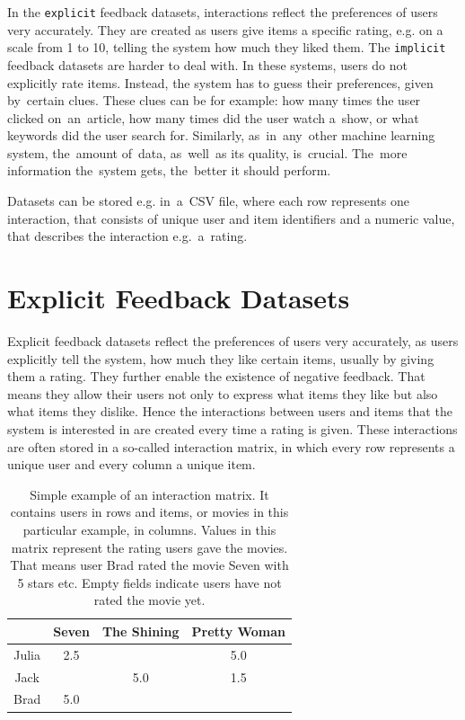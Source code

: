 In the \texttt{explicit} feedback datasets, interactions reflect the preferences of users very accurately. They are created as users give items a specific rating, e.g. on a scale from 1 to 10, telling the system how much they liked them. The \texttt{implicit} feedback datasets are harder to deal with. In these systems, users do not explicitly rate items. Instead, the system has to guess their preferences, given by~certain clues. These clues can be for example: how many times the user clicked on~an~article, how many times did the user watch a~show, or what keywords did the user search for.
Similarly, as~in~any~other machine learning system, the~amount of~data, as~well~as its quality, is~crucial. The~more information the~system gets, the~better it should perform.

Datasets can be stored e.g. in~a~CSV file, where each row represents one interaction, that consists of unique user and item identifiers and a numeric value, that describes the interaction e.g.~a~rating.


\section{Explicit Feedback Datasets}

Explicit feedback datasets reflect the preferences of users very accurately, as users explicitly tell the system, how much they like certain items, usually by giving them a rating. They further enable the existence of negative feedback. That means they allow their users not only to express what items they like but also what items they dislike. Hence the interactions between users and items that the system is interested in are created every time a rating is given. These interactions are often stored in a so-called interaction matrix, in which every row represents a unique user and every column a unique item. \pagebreak

\begin{table}[h!]
    \centering
    \begin{tabular}{@{}cccc@{}}
    \toprule
          & Seven & The Shining & Pretty Woman \\ \midrule
    \rowcolor[HTML]{EFEFEF}
    Julia & 2.5   &             & 5.0          \\
    Jack  &       & 5.0         & 1.5          \\
    \rowcolor[HTML]{EFEFEF}
    Brad  & 5.0   &             &              \\ \bottomrule
    \end{tabular}
    \caption{Simple example of an interaction matrix. It contains users in rows and items, or movies in this particular example, in columns. Values in this matrix represent the rating users gave the movies. That means user Brad rated the movie Seven with 5 stars etc. Empty fields indicate users have not rated the movie yet.}
    \label{table:Interaction_matrix}
\end{table}

